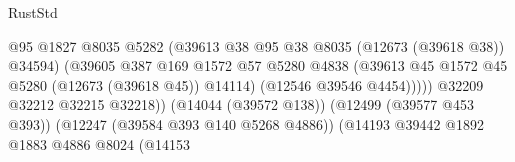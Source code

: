 \begin{lexlean}{RustStd}
\begin{coremodule}
                                                          @95
                                                          @1827
                                                          @8035
                                                          @5282
                                                          (@39613
                                                            @38
                                                            @95
                                                            @38
                                                            @8035
                                                            (@12673 (@39618 @38))
                                                            @34594)
                                                          (@39605
                                                            @387
                                                            @169
                                                            @1572
                                                            @57
                                                            @5280
                                                            @4838
                                                            (@39613
                                                              @45
                                                              @1572
                                                              @45
                                                              @5280
                                                              (@12673 (@39618 @45))
                                                              @14114)
                                                            (@12546 @39546 @4454)))))
                                                    @32209
                                                    @32212
                                                    @32215
                                                    @32218))
                                                (@14044 (@39572 @138))
                                                (@12499 (@39577 @453 @393))
                                                (@12247 (@39584 @393 @140 @5268 @4886))
                                                (@14193
                                                  @39442
                                                  @1892
                                                  @1883
                                                  @4886
                                                  @8024
                                                  (@14153

\end{coremodule}
\end{lexlean}
